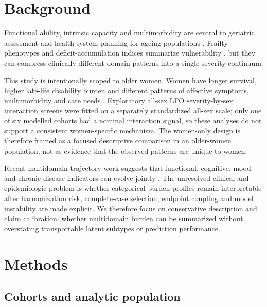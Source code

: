 \documentclass[pdflatex,sn-vancouver-num]{sn-jnl}
\begin{document}
\section{Background}\label{sec:background}

Functional ability, intrinsic capacity and multimorbidity are central to geriatric assessment and health-system planning for ageing populations \cite{who2015worldreport,who2017icope,cesari2018evidence,barnett2012multimorbidity}. Frailty phenotypes and deficit-accumulation indices summarize vulnerability \cite{fried2001frailty,rockwood2007frailty,clegg2013frailty}, but they can compress clinically different domain patterns into a single severity continuum.

This study is intentionally scoped to older women. Women have longer survival, higher late-life disability burden and different patterns of affective symptoms, multimorbidity and care needs \cite{crimmins2011gender}. Exploratory all-sex LFO severity-by-sex interaction screens were fitted on a separately standardized all-sex scale; only one of six modelled cohorts had a nominal interaction signal, so these analyses do not support a consistent women-specific mechanism. The women-only design is therefore framed as a focused descriptive comparison in an older-women population, not as evidence that the observed patterns are unique to women.

Recent multidomain trajectory work suggests that functional, cognitive, mood and chronic-disease indicators can evolve jointly \cite{quinones2022multidimensional}. The unresolved clinical and epidemiologic problem is whether categorical burden profiles remain interpretable after harmonization risk, complete-case selection, endpoint coupling and model instability are made explicit. We therefore focus on conservative description and claim calibration: whether multidomain burden can be summarized without overstating transportable latent subtypes or prediction performance.

\section{Methods}\label{sec:methods}

\subsection{Cohorts and analytic population}
\end{document}

